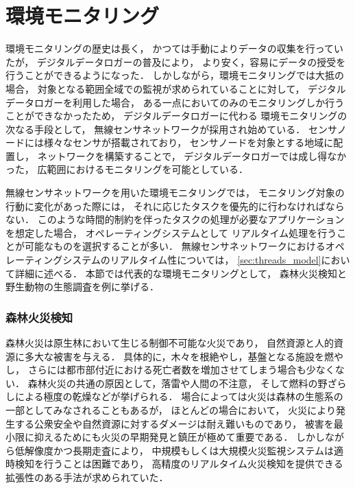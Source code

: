 \section{環境モニタリング}
環境モニタリングの歴史は長く，
かつては手動によりデータの収集を行っていたが，
デジタルデータロガーの普及により，
より安く，容易にデータの授受を行うことができるようになった．
しかしながら，環境モニタリングでは大抵の場合，
対象となる範囲全域での監視が求められていることに対して，
デジタルデータロガーを利用した場合，
ある一点においてのみのモニタリングしか行うことができなかったため，
デジタルデータロガーに代わる
環境モニタリングの次なる手段として，
無線センサネットワークが採用され始めている．
センサノードには様々なセンサが搭載されており，
センサノードを対象とする地域に配置し，
ネットワークを構築することで，
デジタルデータロガーでは成し得なかった，
広範囲におけるモニタリングを可能としている．

無線センサネットワークを用いた環境モニタリングでは，
モニタリング対象の行動に変化があった際には，
それに応じたタスクを優先的に行わなければならない．
このような時間的制約を伴ったタスクの処理が必要なアプリケーションを想定した場合，
オペレーティングシステムとして
リアルタイム処理を行うことが可能なものを選択することが多い．
無線センサネットワークにおけるオペレーティングシステムのリアルタイム性については，
\ref{sec:threads_model}において詳細に述べる．
本節では代表的な環境モニタリングとして，
森林火災検知と野生動物の生態調査を例に挙げる．




\subsubsection{森林火災検知}

\vspace{0.5em}森林火災は原生林において生じる制御不可能な火災であり，
自然資源と人的資源に多大な被害を与える．
具体的に，木々を根絶やし，基盤となる施設を燃やし，
さらには都市部付近における死亡者数を増加させてしまう場合も少なくない．
森林火災の共通の原因として，落雷や人間の不注意，
そして燃料の野ざらしによる極度の乾燥などが挙げられる．
場合によっては火災は森林の生態系の一部としてみなされることもあるが，
ほとんどの場合において，
火災により発生する公衆安全や自然資源に対するダメージは耐え難いものであり，
被害を最小限に抑えるためにも火災の早期発見と鎮圧が極めて重要である．
しかしながら低解像度かつ長期走査により，
中規模もしくは大規模火災監視システムは適時検知を行うことは困難であり，
高精度のリアルタイム火災検知を提供できる拡張性のある手法が求められていた．

